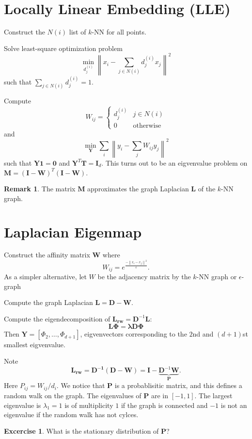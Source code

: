 \documentclass[11pt]{article}
\newcommand{\norm}[1]{\left\lVert#1\right\rVert}
\theoremstyle{definition}
\newtheorem{remark}{Remark}
\newtheorem{excercise}{Excercise}
\begin{document}
\section{Locally Linear Embedding (LLE)} 
\begin{steps}
    \item Construct the $N(i)$ list of $k$-NN for all points.
    \item Solve least-square optimization problem
        \[
            \min _{d_j^{(i)}} \norm{x_i- \sum_{j\in N(i)} d_j^{(i)} x_j}^2
        \]
        such that $\sum_{j\in N(i)} d_j^{(i)} =1$.
    \item Compute 
        \[
            W_{ij} = \begin{cases}
                d_j^{(i)} & j\in N(i)\\
                0 & \text{otherwise}
            \end{cases}
        \]
        and 
    \[
        \min _{\bm{Y}} \sum_{i} \norm{y_i -\sum_j W_{ij}y_j}^2
    \]
    such that $\bm{Y}\bm{1}=\bm{0}$ and $\bm{Y}^T\bm{T}=\bm{I}_d$. This turns out to be an eigvenvalue problem on $\bm{M}=(\bm{I}-\bm{W})^T(\bm{I}-\bm{W})$.
\end{steps}
\begin{remark}
    The matrix $\bm{M}$ approximates the graph Laplacian $\bm{L}$ of the $k$-NN graph.
\end{remark}

\section{Laplacian Eigenmap}
\begin{steps}
\item Construct the affinity matrix $\bm{W}$ where 
    \[ 
    W_{ij} = e^{\frac{-\norm{x_i-x_j}^2}{\epsilon}}.
    \]
    As a simpler alternative, let $W$ be the adjacency matrix by the $k$-NN graph or $\epsilon$-graph
\item Compute the graph Laplacian $\bm{L} = \mathbf{D} - \bm{W}$.
\item Compute the eigendecomposition of $\bm{L_{rw}} = \bm{D}^{-1}\bm{L}$:
    \[
        \bm{L\Phi} =\bm{\lambda D \Phi}
    \]
    Then $\mathbf{Y} = [\Phi_2, \ldots, \Phi_{d+1}]$, eigvenvectors corresponding to the $2$nd and $(d+1)$st smallest eigvenvalue.
    \end{steps}
Note 
    \[
        \mathbf{L_{rw} = \bm{D}^{-1} (\bm{D}-\bm{W})} = \bm{I} - \underbrace{\bm{D}^{-1}\bm{W}}_{\bm{P}}.
    \]
    Here $P_{ij}= W_{ij} / d_i$.  We notice that $\mathbf{P}$ is a probablisitic matrix, and this defines a random walk on the graph. The eigenvalues of $\bm{P}$ are in $[-1,1]$. The largest eigenvalue is $\lambda_1 =1$ is of multiplicity $1$ if the graph is connected and $-1$ is not an eigenvalue if the random walk has not cylces.
\begin{excercise}
    What is the stationary distribution of $\bm{P}$?
\end{excercise}



\end{document}
